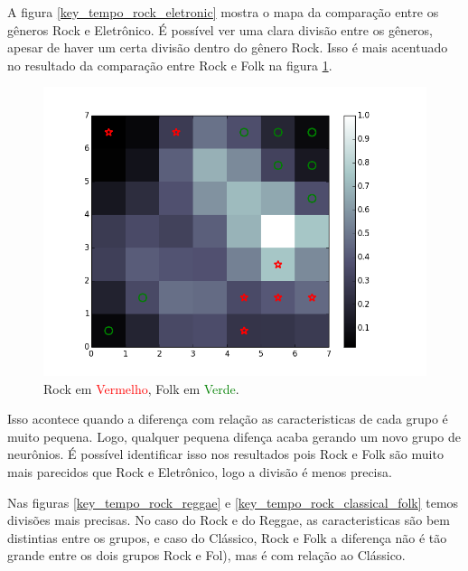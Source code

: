 \documentclass[journal]{IEEEtran}
\begin{document}
A figura \ref{key_tempo_rock_eletronic} mostra o mapa da comparação entre os gêneros Rock e Eletrônico. É possível ver uma clara divisão entre os gêneros, apesar de haver um certa divisão dentro do gênero Rock. Isso é mais acentuado no resultado da comparação entre Rock e Folk na figura \ref{key_tempo_rock_folk}.

\begin{figure}[H]
\centering
\includegraphics[scale=0.5]{images/key_tempo_rock_folk.png}
\caption{Rock em \textcolor{red}{Vermelho}, Folk em \textcolor{green}{Verde}.}\label{key_tempo_rock_folk}
\end{figure}

Isso acontece quando a diferença com relação as caracteristicas de cada grupo é muito pequena. Logo, qualquer pequena difença acaba gerando um novo grupo de neurônios. É possível identificar isso nos resultados pois Rock e Folk são muito mais parecidos que Rock e Eletrônico, logo a divisão é menos precisa.

Nas figuras \ref{key_tempo_rock_reggae} e \ref{key_tempo_rock_classical_folk} temos divisões mais precisas. No caso do Rock e do Reggae, as caracteristicas são bem distintias entre os grupos, e caso do Clássico, Rock e Folk a diferença não é tão grande entre os dois grupos Rock e Fol), mas é com relação ao Clássico.
\end{document}
